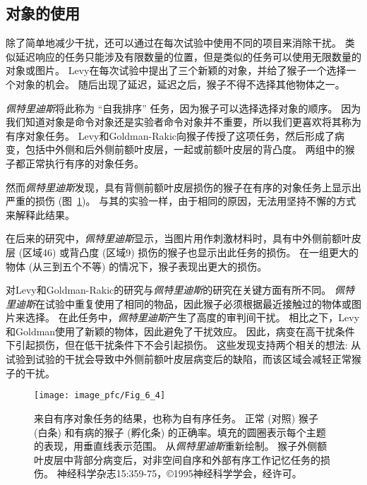\subsection{对象的使用}

除了简单地减少干扰，还可以通过在每次试验中使用不同的项目来消除干扰。
类似延迟响应的任务只能涉及有限数量的位置，但是类似的任务可以使用无限数量的对象或图片。
Levy\cite{levy1999association}在每次试验中提出了三个新颖的对象，并给了猴子一个选择一个对象的机会。
随后出现了延迟，延迟之后，猴子不得不选择其他物体之一。


\textit{佩特里迪斯}\cite{petrides1995impairments}将此称为 “自我排序” 任务，因为猴子可以选择选择对象的顺序。
因为我们知道对象是命令对象还是实验者命令对象并不重要，所以我们更喜欢将其称为有序对象任务。
Levy和Goldman-Rakic向猴子传授了这项任务，然后形成了病变，包括中外侧和后外侧前额叶皮层，一起或前额叶皮层的背凸度。
两组中的猴子都正常执行有序的对象任务。


然而\textit{佩特里迪斯}\cite{petrides1995impairments}发现，具有背侧前额叶皮层损伤的猴子在有序的对象任务上显示出严重的损伤 (图~\ref{fig:6_4})。
与其的实验一样，由于相同的原因，无法用坚持不懈的方式来解释此结果。


在后来的研究中，\textit{佩特里迪斯}\cite{petrides2000dissociable}显示，当图片用作刺激材料时，具有中外侧前额叶皮层 (区域46) 或背凸度 (区域9) 损伤的猴子也显示出此任务的损伤。
在一组更大的物体 (从三到五个不等) 的情况下，猴子表现出更大的损伤。


对Levy和Goldman-Rakic的研究与\textit{佩特里迪斯}的研究在关键方面有所不同。
\textit{佩特里迪斯}在试验中重复使用了相同的物品，因此猴子必须根据最近接触过的物体或图片来选择。
在此任务中，\textit{佩特里迪斯}产生了高度的审判间干扰。
相比之下，Levy和Goldman使用了新颖的物体，因此避免了干扰效应。
因此，病变在高干扰条件下引起损伤，但在低干扰条件下不会引起损伤。
这些发现支持两个相关的想法: 从试验到试验的干扰会导致中外侧前额叶皮层病变后的缺陷，而该区域会减轻正常猴子的干扰。


\begin{figure}
	\centering
	\texttt{[image: image\_pfc/Fig\_6\_4]}
	\caption{来自有序对象任务的结果，也称为自有序任务。
		正常 (对照) 猴子 (白条) 和有病的猴子 (孵化条) 的正确率。填充的圆圈表示每个主题的表现，用垂直线表示范围。
		从\textit{佩特里迪斯}重新绘制。
		猴子外侧额叶皮层中背部分病变后，对非空间自序和外部有序工作记忆任务的损伤。
		神经科学杂志15:359-75，©1995神经科学学会，经许可。}
	\label{fig:6_4}
\end{figure}



